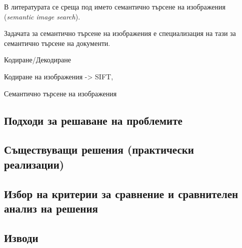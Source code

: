 \documentclass[a4paper,12pt]{article}
\begin{document}
В литературата се среща под името семантично търсене на изображения (\textit{semantic image search}). 

\bigbreak

Задачата за семантично търсене на изображения е специализация на тази за семантично търсене на документи. 

Кодиране/Декодиране

Кодиране на изображения -> SIFT, 

Семантично търсене на изображения

\subsection{Подходи за решаване на проблемите}

\subsection{Съществуващи решения (практически реализации)}

\subsection{Избор на критерии за сравнение и сравнителен анализ на решения}

\subsection{Изводи}

\printbibliography[title={Използвана литература}]
\end{document}
